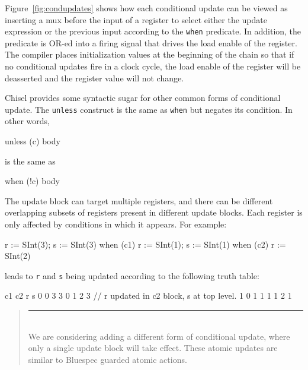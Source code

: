 \documentclass[twocolumn,10pt]{article}
\newenvironment{commentary}
{ \vspace{-0.1in}
  \begin{quotation}
  \noindent
  \small \em
  \rule{\linewidth}{1pt}\\
}
{
  \end{quotation}
}
\def\code#1{{\tt #1}}
\begin{document}
Figure~\ref{fig:condupdates} shows how each conditional update can be
viewed as inserting a mux before the input of a register to select
either the update expression or the previous input according to the
\code{when} predicate.  In addition, the predicate is OR-ed into a
firing signal that drives the load enable of the register.  The
compiler places initialization values at the beginning of the chain so
that if no conditional updates fire in a clock cycle, the load enable
of the register will be deasserted and the register value will not
change.
 
Chisel provides some syntactic sugar for other common forms of
conditional update.  The \verb+unless+ construct is the same as
\verb+when+ but negates its condition.  In other words,
\begin{scala}
unless (c) { body }
\end{scala}
is the same as
\begin{scala}
when (!c) { body }
\end{scala}

% 

The update block can target multiple registers, and there can be
different overlapping subsets of registers present in different update
blocks.  Each register is only affected by conditions in which it
appears.  For example:
\begin{scala}
r := SInt(3); s := SInt(3)
when (c1)   { r := SInt(1); s := SInt(1) }
when (c2)   { r := SInt(2) }
\end{scala}

\noindent
leads to \code{r} and \code{s} being updated according to the
following truth table:
\begin{scala}
c1 c2  r  s
0   0  3  3
0   1  2  3 // r updated in c2 block, s at top level.
1   0  1  1
1   1  2  1
\end{scala}

\begin{commentary}
We are considering adding a different form of conditional update,
where only a single update block will take effect.  These atomic
updates are similar to Bluespec guarded atomic actions.
\end{commentary}
\end{document}
